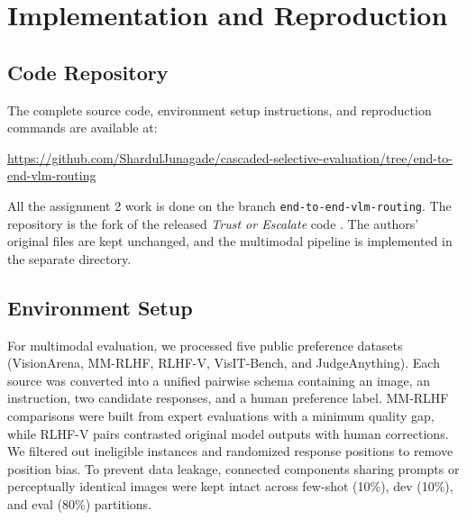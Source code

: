 \documentclass[11pt]{article}
\begin{document}
\section{Implementation and Reproduction}
\label{sec:reproduction}

\subsection{Code Repository}

The complete source code, environment setup instructions, and reproduction commands are available at:

\begin{center}
\url{https://github.com/ShardulJunagade/cascaded-selective-evaluation/tree/end-to-end-vlm-routing}
\end{center}

All the assignment 2 work is done on the branch \texttt{end-to-end-vlm-routing}. The repository is the fork of the released \emph{Trust or Escalate} code \citep{jung2024trust}. The authors' original files are kept unchanged, and the multimodal pipeline is implemented in the separate directory.

\subsection{Environment Setup}

For multimodal evaluation, we processed five public preference datasets (VisionArena, MM-RLHF, RLHF-V, VisIT-Bench, and JudgeAnything). Each source was converted into a unified pairwise schema containing an image, an instruction, two candidate responses, and a human preference label. MM-RLHF comparisons were built from expert evaluations with a minimum quality gap, while RLHF-V pairs contrasted original model outputs with human corrections. We filtered out ineligible instances and randomized response positions to remove position bias. To prevent data leakage, connected components sharing prompts or perceptually identical images were kept intact across few-shot (10\%), dev (10\%), and eval (80\%) partitions. 

\end{document}
